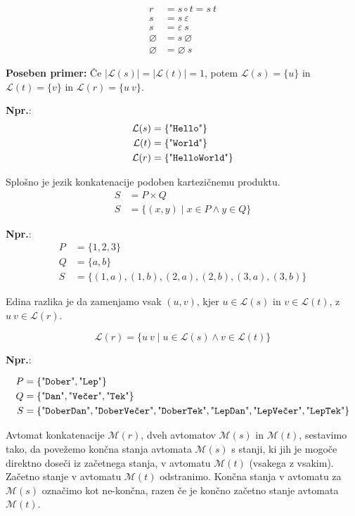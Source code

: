 \documentclass{article}
\newcommand{\Ex}{\textbf{Npr.}:\ }
\newcommand{\Special}[1]{\textbf{#1}}
\newcommand{\Empty}{\varnothing}
\newcommand{\Null}{\varepsilon}
\newcommand{\Language}[1]{\mathcal{L}(#1)}
\newcommand{\Automaton}[1]{\mathcal{M}(#1)}
\newcommand{\Str}[1]{\text{\textquotedbl\texttt{#1}\textquotedbl}}
\newcommand{\Seq}{\ }
\begin{document}
\begin{align*}
  r &= s \circ t = s \Seq t \\
  s &= s \Seq \Null \\
  s &= \Null \Seq s \\
  \Empty &= s \Seq \Empty \\
  \Empty &= \Empty \Seq s
\end{align*}

\Special{Poseben primer:} Če $|\Language{s}| = |\Language{t}| = 1$, potem $\Language{s} = \{u\}$ in $\Language{t} = \{v\}$ in $\Language{r} = \{u \Seq v\}$.

\Ex
\begin{align*}
  \Language{s} &= \{\Str{Hello}\}\\
  \Language{t} &= \{\Str{World}\}\\
  \Language{r} &= \{\Str{HelloWorld}\}
\end{align*}

Splošno je jezik konkatenacije podoben kartezičnemu produktu.
\begin{align*}
  S &= P \times Q \\
  S &= \{ (x, y) \mid x \in P \land y \in Q\}
\end{align*}

\Ex
\begin{align*}
  P &= \{1, 2, 3\}\\
  Q &= \{a, b\}\\
  S &= \{(1, a), (1, b), (2, a), (2, b), (3, a), (3, b) \}
\end{align*}

Edina razlika je da zamenjamo vsak $(u, v)$, kjer $u \in \Language{s}$ in $v\in \Language{t}$, z $u \Seq v \in \Language{r}$.

\begin{equation*}
  \Language{r} = \{ u \Seq v \mid u \in \Language{s} \land v \in \Language{t}\}
\end{equation*}

\Ex

\begin{align*}
  P &= \{\Str{Dober}, \Str{Lep}\}\\
  Q &= \{\Str{Dan}, \Str{Večer}, \Str{Tek}\}\\
  S &= \{\Str{DoberDan}, \Str{DoberVečer}, \Str{DoberTek}, \Str{LepDan}, \Str{LepVečer}, \Str{LepTek} \}
\end{align*}

Avtomat konkatenacije $\Automaton{r}$, dveh avtomatov $\Automaton{s}$ in $\Automaton{t}$, sestavimo tako, da povežemo končna stanja avtomata $\Automaton{s}$ s stanji, ki jih je mogoče direktno doseči iz začetnega stanja, v avtomatu $\Automaton{t}$ (vsakega z vsakim).
Začetno stanje v avtomatu $\Automaton{t}$ odstranimo.
Končna stanja v avtomatu za $\Automaton{s}$ označimo kot ne-končna, razen če je končno začetno stanje avtomata $\Automaton{t}$.
\end{document}
